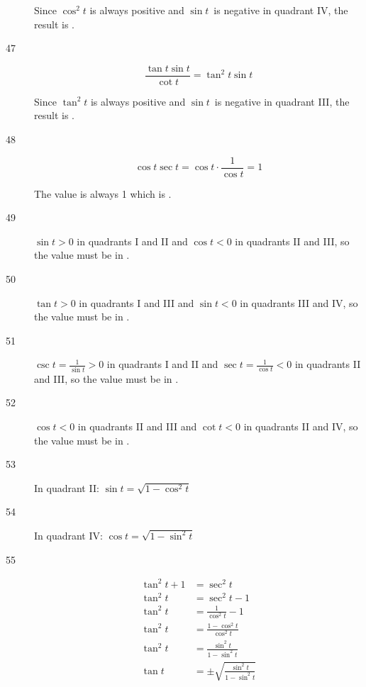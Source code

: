 \documentclass{exam}
\begin{document}
\begin{description}
        Since $\cos^2 t$ is always positive and $\sin t$ is negative in quadrant IV, the result is .

      \item[47]
        \[
          \frac{\tan t \sin t}{\cot t} = \tan^2 t \sin t
        \]

        Since $\tan^2 t$ is always positive and $\sin t$ is negative in quadrant III, the result is .

      \item[48]
        \[
          \cos t \sec t = \cos t \cdot \frac{1}{\cos t} = 1
        \]

        The value is always 1 which is .

      \item[49] $\sin t > 0$ in quadrants I and II and $\cos t < 0$ in quadrants II and III, so the value must be in
        .

      \item[50] $\tan t > 0$ in quadrants I and III and $\sin t < 0$ in quadrants III and IV, so the value must be in
        .

      \item[51] $\csc t = \frac{1}{\sin t} > 0$ in quadrants I and II and $\sec t = \frac{1}{\cos t} < 0$ in quadrants
        II and III, so the value must be in .

      \item[52] $\cos t < 0$ in quadrants II and III and $\cot t < 0$ in quadrants II and IV, so the value must be in
        .

      \item[53] In quadrant II: $\sin t = \boxed{ \sqrt{1 - \cos^2 t} }$

      \item[54] In quadrant IV: $\cos t = \boxed{ \sqrt{1 - \sin^2 t} }$

      \item[55] 
        \begin{align*}
          \tan^2 t + 1 & = \sec^2 t \\
          \tan^2 t     & = \sec^2 t - 1 \\
          \tan^2 t     & = \frac{1}{\cos^2 t} - 1 \\
          \tan^2 t     & = \frac{1 - \cos^2 t}{\cos^2 t} \\
          \tan^2 t     & = \frac{\sin^2 t}{1 - \sin^2 t} \\
          \tan t       & = \pm \sqrt{ \frac{\sin^2 t}{1 - \sin^2 t} } \\
        \end{align*}


\end{description}
\end{document}
